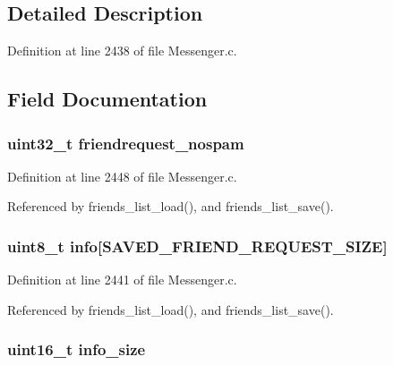 \subsection{Detailed Description}


Definition at line 2438 of file Messenger.\+c.



\subsection{Field Documentation}
\hypertarget{struct_s_a_v_e_d___f_r_i_e_n_d_a0fae9801a4789a368f90125119e31f3f}{
\subsubsection[{friendrequest\+\_\+nospam}]{\setlength{\rightskip}{0pt plus 5cm}uint32\+\_\+t friendrequest\+\_\+nospam}}\label{struct_s_a_v_e_d___f_r_i_e_n_d_a0fae9801a4789a368f90125119e31f3f}


Definition at line 2448 of file Messenger.\+c.



Referenced by friends\+\_\+list\+\_\+load(), and friends\+\_\+list\+\_\+save().

\hypertarget{struct_s_a_v_e_d___f_r_i_e_n_d_a30d0b669f0c53df867104ef9fc4ca5ac}{
\subsubsection[{info}]{\setlength{\rightskip}{0pt plus 5cm}uint8\+\_\+t info\mbox{[}{\bf S\+A\+V\+E\+D\+\_\+\+F\+R\+I\+E\+N\+D\+\_\+\+R\+E\+Q\+U\+E\+S\+T\+\_\+\+S\+I\+Z\+E}\mbox{]}}}\label{struct_s_a_v_e_d___f_r_i_e_n_d_a30d0b669f0c53df867104ef9fc4ca5ac}


Definition at line 2441 of file Messenger.\+c.



Referenced by friends\+\_\+list\+\_\+load(), and friends\+\_\+list\+\_\+save().

\hypertarget{struct_s_a_v_e_d___f_r_i_e_n_d_ac0ae002db55ef8f8366de10ec005b65a}{
\subsubsection[{info\+\_\+size}]{\setlength{\rightskip}{0pt plus 5cm}uint16\+\_\+t info\+\_\+size}}\label{struct_s_a_v_e_d___f_r_i_e_n_d_ac0ae002db55ef8f8366de10ec005b65a}


